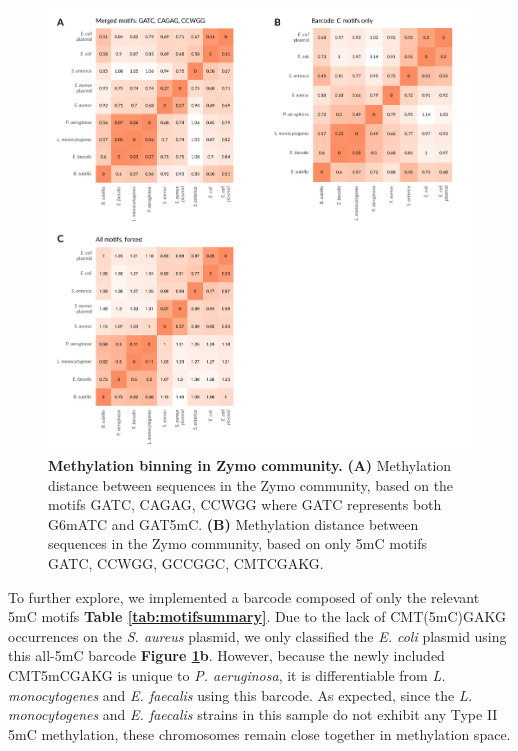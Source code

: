 \begin{figure}[!hb]
\centering
\includegraphics[width = 1\linewidth,keepaspectratio]{figure/zheatmaps.pdf}
\caption[Methylation binning in Zymo community]{{\bf Methylation binning in Zymo community.} {\bf (A)} Methylation distance between sequences in the Zymo community, based on the motifs GATC, CAGAG, CCWGG where GATC represents both G6mATC and GAT5mC. {\bf (B)} Methylation distance between sequences in the Zymo community, based on only 5mC motifs GATC, CCWGG, GCCGGC, CMTCGAKG. }
\label{fig:zheatmaps}
\end{figure}


To further explore, we implemented a barcode composed of only the relevant 5mC motifs {\bf Table \ref{tab:motifsummary}}. Due to the lack of CMT(5mC)GAKG occurrences on the \textit{S. aureus} plasmid, we only classified the \textit{E. coli} plasmid using this all-5mC barcode {\bf Figure \ref{fig:zheatmaps}b}. However, because the newly included CMT5mCGAKG is unique to \textit{P. aeruginosa}, it is differentiable from \textit{L. monocytogenes} and \textit{E. faecalis} using this barcode. As expected, since the \textit{L. monocytogenes} and \textit{E. faecalis} strains in this sample do not exhibit any Type II 5mC methylation, these chromosomes remain close together in methylation space.


